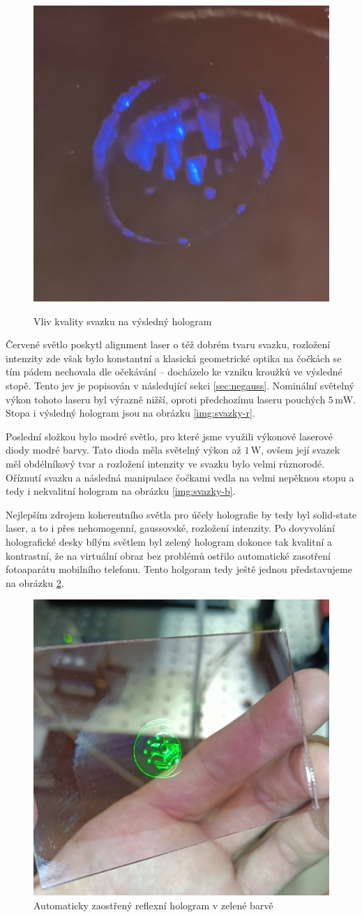 \documentclass[twoside,project]{../MFFPrace}
\begin{document}
\begin{figure}[!ht]
{        \includegraphics[width=0.3\linewidth]{../img/hologram-r-b.jpg}
        \label{img:svazky-b}
    }
    \caption{Vliv kvality svazku na výsledný hologram}
    \label{img:svazky}
\end{figure}

Červené světlo poskytl alignment laser o též dobrém tvaru svazku, rozložení intenzity zde však bylo konstantní a klasická geometrické optika na čočkách se tím pádem nechovala dle očekávání -- docházelo ke vzniku kroužků ve výsledné stopě. Tento jev je popisován v následující sekci \ref{sec:negauss}. Nominální světelný výkon tohoto laseru byl výrazně nižší, oproti předchozímu laseru pouchých $5\,\text{mW}$. Stopa i výsledný hologram jsou na obrázku \ref{img:svazky-r}.

Poslední složkou bylo modré světlo, pro které jsme využili výkonové laserové diody modré barvy. Tato dioda měla světelný výkon až $1\,\text{W}$, ovšem její svazek měl obdélníkový tvar a rozložení intenzity ve svazku bylo velmi různorodé. Oříznutí svazku a následná manipulace čočkami vedla na velmi nepěknou stopu a tedy i nekvalitní hologram na obrázku \ref{img:svazky-b}.

\medskip

Nejlepším zdrojem koherentního světla pro účely holografie by tedy byl solid-state laser, a to i přes nehomogenní, gaussovské, rozložení intenzity. Po dovyvolání holografické desky bílým světlem byl zelený hologram dokonce tak kvalitní a kontrastní, že na virtuální obraz bez problémů ostřilo automatické zasotření fotoaparátu mobilního telefonu. Tento holgoram tedy ještě jednou představujeme na obrázku \ref{img:hologram-refl}. %

\begin{figure}
    \centering
    \includegraphics[width=0.6\linewidth]{../img/hologram-r-g2.jpg}
    \caption{Automaticky zaostřený reflexní hologram v zelené barvě}
    \label{img:hologram-refl}
\end{figure}
\end{document}
